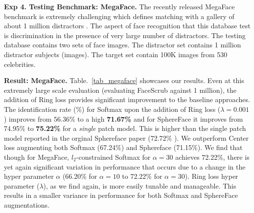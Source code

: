 \documentclass[10pt,twocolumn,letterpaper]{article}
\begin{document}
\textbf{Exp 4. Testing Benchmark: MegaFace. } The recently released MegaFace benchmark is extremely challenging which defines matching with a gallery of about 1 million distractors \cite{kemelmacher2016megaface}. The aspect of face recognition that this database test is discrimination in the presence of very large number of distractors. The testing database contains two sets of face images. The distractor set contains 1 million distractor subjects (images). The target set contain 100K images from 530 celebrities.






\textbf{Result: MegaFace.}  Table.~\ref{tab_megaface} showcases our results. Even at this extremely large scale evaluation (evaluating FaceScrub against 1 million), the addition of Ring loss provides significant improvement to the baseline approaches. The identification rate ($\%$) for Softmax upon the addition of Ring loss ($\lambda = 0.001$) improves from 56.36\% to a high \textbf{71.67\%} and for SphereFace it improves from 74.95\% to \textbf{75.22\%} for a \textit{single} patch model. This is higher than the single patch model reported in the orginal Sphereface paper (72.72\% \cite{liu2017sphereface}). We outperform Center loss  \cite{wen2016discriminative} augmenting both Softmax (67.24\%) and Sphereface (71.15\%). We find that though for MegaFace, $l_2$-constrained Softmax \cite{ranjan2017l2} for $\alpha=30$  achieves 72.22\%, there is yet again significant variation in performance that occurs due to a change in the hyper parameter $\alpha$ (66.20\% for $\alpha=10$ to 72.22\% for $\alpha=30$). Ring loss hyper parameter ($\lambda$), as we find again, is more easily tunable and manageable. This results in a smaller variance in performance for both Softmax and SphereFace augmentations.

\end{document}
